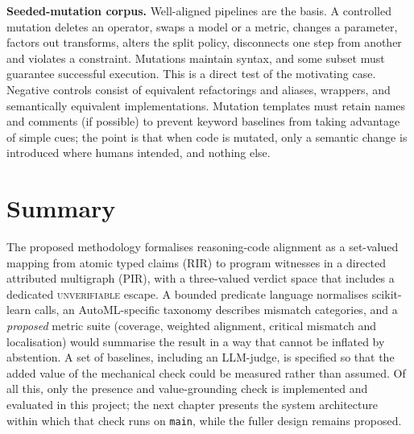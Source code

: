 \textbf{Seeded-mutation corpus.} Well-aligned pipelines are the
basis. A controlled mutation deletes an operator, swaps a model or a
metric, changes a parameter, factors out transforms, alters the
split policy, disconnects one step from another and violates a
constraint. Mutations maintain syntax, and some subset must
guarantee successful execution. This is a direct test of the
motivating case. Negative controls consist of equivalent
refactorings and aliases, wrappers, and semantically equivalent
implementations. Mutation templates must retain names and comments
(if possible) to prevent keyword baselines from taking advantage of
simple cues; the point is that when code is mutated, only a semantic
change is introduced where humans intended, and nothing else.

\section{Summary}

The proposed methodology formalises reasoning-code alignment as a
set-valued mapping from atomic typed claims (RIR) to program
witnesses in a directed attributed multigraph (PIR), with a
three-valued verdict space that includes a dedicated
\textsc{unverifiable} escape. A bounded predicate language
normalises scikit-learn calls, an AutoML-specific taxonomy
describes mismatch categories, and a \emph{proposed} metric suite
(coverage, weighted alignment, critical mismatch and localisation)
would summarise the result in a way that cannot be inflated by
abstention. A set of baselines, including an LLM-judge, is specified
so that the added value of the mechanical check could be measured
rather than assumed. Of all this, only the presence and
value-grounding check is implemented and evaluated in this project;
the next chapter presents the system architecture within which that
check runs on \texttt{main}, while the fuller design remains proposed.
